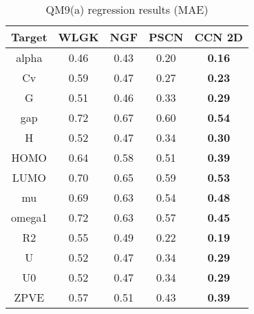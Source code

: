 
\begin{table}
\caption{\label{tbl:qm9mae} QM9(a) regression results (MAE)}
\begin{center}
\begin{tabular}{|| c | c | c | c | c ||}
	\hline
	Target              & WLGK 		& NGF 	& PSCN  			&  CCN 2D   \\
	\hline\hline
	alpha               & 0.46		& 0.43	& 0.20  			& \textbf{0.16}	    \\
	\hline
	Cv	                & 0.59  	& 0.47	& 0.27  			& \textbf{0.23}	    \\
	\hline
	G 	                & 0.51		& 0.46	& 0.33  			& \textbf{0.29}	    \\
	\hline
	gap 	            & 0.72		& 0.67	& 0.60  			& \textbf{0.54}	    \\
	\hline
	H 	                & 0.52		& 0.47	& 0.34  			& \textbf{0.30}	    \\
	\hline
	HOMO 	            & 0.64		& 0.58	& 0.51 				& \textbf{0.39}      \\
	\hline
	LUMO 	            & 0.70		& 0.65	& 0.59  			& \textbf{0.53}	    \\
	\hline
	mu	 				& 0.69		& 0.63	& 0.54  			& \textbf{0.48}		\\
	\hline
	omega1 				& 0.72		& 0.63	& 0.57  			& \textbf{0.45}		\\
	\hline
	R2	 				& 0.55		& 0.49	& 0.22  			& \textbf{0.19}	    \\
	\hline
	U	 	            & 0.52		& 0.47	& 0.34  			& \textbf{0.29}      \\
	\hline
	U0	                & 0.52		& 0.47	& 0.34  			& \textbf{0.29}	    \\
	\hline
	ZPVE 	            & 0.57		& 0.51	& 0.43  			& \textbf{0.39}	    \\
	\hline
\end{tabular}
\end{center}
\end{table}